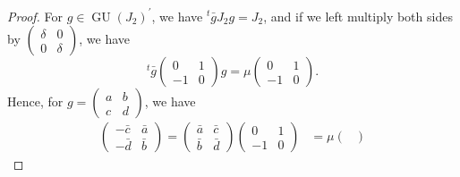 \documentclass[11pt, a4paper]{amsart}
\theoremstyle{plain}
\theoremstyle{definition}
\numberwithin{equation}{section}
\DeclareMathOperator{\GU}{GU}
\begin{document}
\begin{proof}
     For $g \in \GU(J_2)^{\prime}$, we have $^{t}{\bar{g}}J_2g = J_2$, and if we left multiply both sides by $\left( \begin{matrix}
                                                                                                                            \delta & 0 \\
                                                                                                                            0 & \delta 
                                                                                                                         \end{matrix} \right)$, 
    we have 
    \begin{equation*}
        ^{t}{\bar{g}}\begin{pmatrix}
                        0 & 1 \\
                        -1 & 0
                    \end{pmatrix}g = \mu \begin{pmatrix}
                                        0 & 1 \\
                                        -1 & 0
                                     \end{pmatrix}. 
    \end{equation*}
    Hence, for $g = \left( \begin{matrix}
                              a & b \\
                              c & d
                            \end{matrix} \right)$, we have 
    \begin{align*}
        \begin{pmatrix}
            -\bar{c} & \bar{a} \\
            -\bar{d} & \bar{b}
        \end{pmatrix}=\begin{pmatrix}
                        \bar{a} & \bar{c} \\
                        \bar{b} & \bar{d} 
                      \end{pmatrix} \begin{pmatrix}
                                        0 & 1 \\
                                        -1 & 0 
                                    \end{pmatrix} & = \mu \begin{pmatrix}

\end{pmatrix}
\end{align*}
\end{proof}
\end{document}
